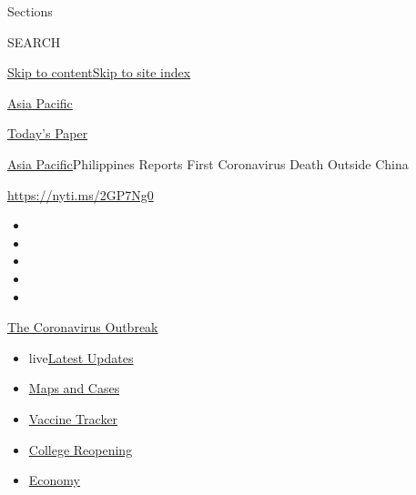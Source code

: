 Sections

SEARCH

\protect\hyperlink{site-content}{Skip to
content}\protect\hyperlink{site-index}{Skip to site index}

\href{https://www.nytimes.com/section/world/asia}{Asia Pacific}

\href{https://myaccount.nytimes.com/auth/login?response_type=cookie\&client_id=vi}{}

\href{https://www.nytimes.com/section/todayspaper}{Today's Paper}

\href{/section/world/asia}{Asia Pacific}\textbar{}Philippines Reports
First Coronavirus Death Outside China

\url{https://nyti.ms/2GP7Ng0}

\begin{itemize}
\item
\item
\item
\item
\item
\end{itemize}

\href{https://www.nytimes.com/news-event/coronavirus?action=click\&pgtype=Article\&state=default\&region=TOP_BANNER\&context=storylines_menu}{The
Coronavirus Outbreak}

\begin{itemize}
\tightlist
\item
  live\href{https://www.nytimes.com/2020/08/04/world/coronavirus-covid-19.html?action=click\&pgtype=Article\&state=default\&region=TOP_BANNER\&context=storylines_menu}{Latest
  Updates}
\item
  \href{https://www.nytimes.com/interactive/2020/us/coronavirus-us-cases.html?action=click\&pgtype=Article\&state=default\&region=TOP_BANNER\&context=storylines_menu}{Maps
  and Cases}
\item
  \href{https://www.nytimes.com/interactive/2020/science/coronavirus-vaccine-tracker.html?action=click\&pgtype=Article\&state=default\&region=TOP_BANNER\&context=storylines_menu}{Vaccine
  Tracker}
\item
  \href{https://www.nytimes.com/2020/08/02/us/covid-college-reopening.html?action=click\&pgtype=Article\&state=default\&region=TOP_BANNER\&context=storylines_menu}{College
  Reopening}
\item
  \href{https://www.nytimes.com/live/2020/08/03/business/stock-market-today-coronavirus?action=click\&pgtype=Article\&state=default\&region=TOP_BANNER\&context=storylines_menu}{Economy}
\end{itemize}

